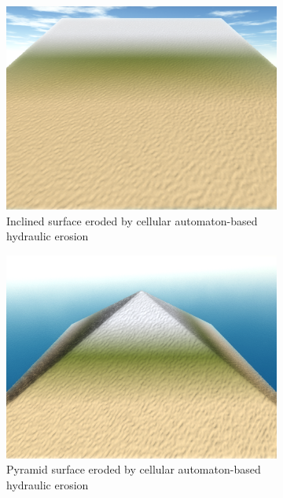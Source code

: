 \documentclass[11pt,a4paper,twoside,openright]{report}
\begin{document}
\begin{figure}[h]
  \centering
  \begin{subfigure}[b]{0.32\textwidth}
    \includegraphics[width=\textwidth]{hydro-10mins-46k-iterations-crooked.png}
    \caption{Inclined surface eroded by cellular automaton-based hydraulic erosion}
    \label{fig:hydro1}
  \end{subfigure}
  \begin{subfigure}[b]{0.32\textwidth}
    \includegraphics[width=\textwidth]{hydro-10mins-46k-iterations-pyramid.png}
    \caption{Pyramid surface eroded by cellular automaton-based hydraulic erosion}
    \label{fig:hydro2}
  \end{subfigure}
  \begin{subfigure}[b]{0.32\textwidth}

\end{subfigure}
\end{figure}
\end{document}
